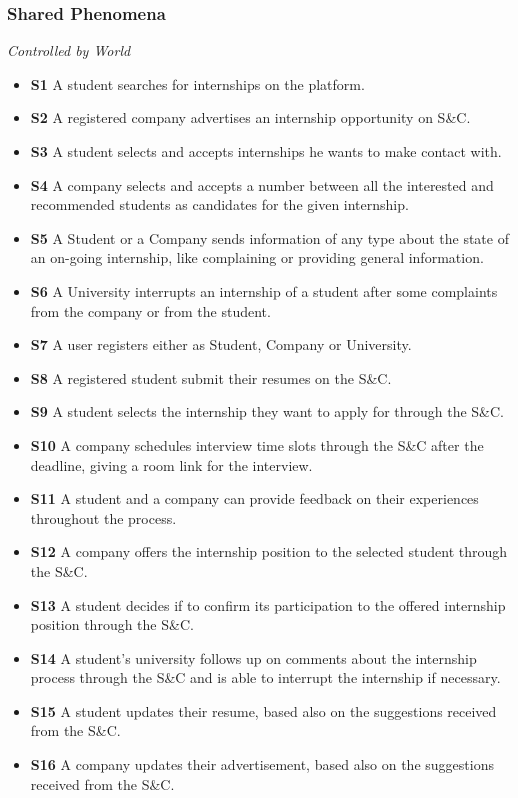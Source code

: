 \documentclass[a4paper,12pt]{article}
\begin{document}
\subsubsection{Shared Phenomena}
    \textit{Controlled by World}
    \begin{itemize}
        \item \textbf{S1} A student searches for internships on the platform.
        \item \textbf{S2} A registered company advertises an internship opportunity on S\&C.
        \item \textbf{S3} A student selects and accepts internships he wants to make contact with.
        \item \textbf{S4} A company selects and accepts a number between all the interested and recommended students as candidates for the given internship.
        \item \textbf{S5} A Student or a Company sends information of any type about the state of an on-going internship, like complaining or providing general information.
        \item \textbf{S6} A University interrupts an internship of a student after some complaints from the company or from the student. 
        \item \textbf{S7} A user registers either as Student, Company or University.
        
        \item \textbf{S8} A registered student submit their resumes on the S\&C.
        
        \item \textbf{S9} A student selects the internship they want to apply for through the S\&C.
        \item \textbf{S10} A company schedules interview time slots through the S\&C after the deadline, giving a room link for the interview.
        \item \textbf{S11} A student and a company can provide feedback on their experiences throughout the process.
        \item \textbf{S12} A company offers the internship position to the selected student through the S\&C.
        \item \textbf{S13} A student decides if to confirm its participation to the offered internship position through the S\&C.
        \item \textbf{S14} A student's university follows up on comments about the internship process through the S\&C and is able to interrupt the internship if necessary.
        \item \textbf{S15} A student updates their resume, based also on the suggestions received from the S\&C.
        \item \textbf{S16} A company updates their advertisement, based also on the suggestions received from the S\&C.
    \end{itemize}
\end{document}
